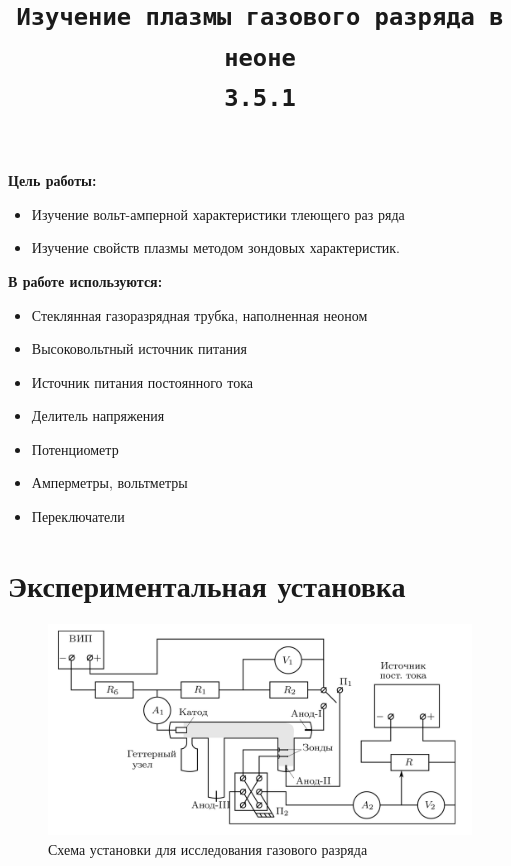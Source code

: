 \documentclass[11pt,a4paper]{article}
\title{\texttt{Изучение плазмы газового разряда в неоне \\ 3.5.1}}
\author{}
\date{}
\begin{document}
\maketitle

\textbf{Цель работы:}
\begin{itemize}
  \item  Изучение вольт-амперной характеристики тлеющего раз­
  ряда
  \item Изучение свойств плазмы методом зондовых характеристик.
\end{itemize}

\textbf{В работе используются:}  
\begin{itemize}
  \item Стеклянная газоразрядная трубка, наполнен­ная неоном
  \item Высоковольтный источник питания
  \item Источник питания посто­янного тока
  \item Делитель напряжения
  \item Потенциометр
  \item Амперметры, вольтметры
  \item Переключатели
\end{itemize}

\section*{Экспериментальная установка}

\begin{figure}[h!]
  \includegraphics*[width=\textwidth]{2023-09-02-00-10-53.png}
  \caption{Схема установки для исследования газового разряда}
  \label{fig:ust}
\end{figure}
\end{document}
